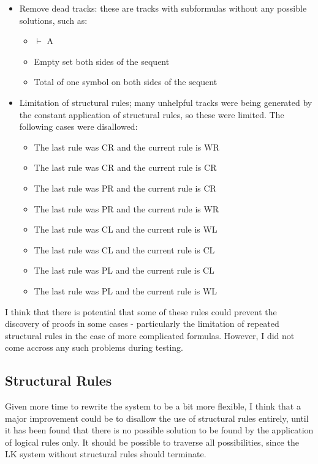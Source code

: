 \documentclass{article}
\begin{document}
\begin{itemize}
  \item Remove dead tracks: these are tracks with subformulas without any
  possible solutions, such as:
  \begin{itemize}
    \item $\vdash$ A
    \item Empty set both sides of the sequent
    \item Total of one symbol on both sides of the sequent
  \end{itemize}

  \item Limitation of structural rules; many unhelpful tracks were being generated by
  the constant application of structural rules, so these were limited. The
  following cases were disallowed:
  \begin{itemize}
    \item The last rule was CR and the current rule is WR
    \item The last rule was CR and the current rule is CR
    \item The last rule was PR and the current rule is CR
    \item The last rule was PR and the current rule is WR
    \item The last rule was CL and the current rule is WL
    \item The last rule was CL and the current rule is CL
    \item The last rule was PL and the current rule is CL
    \item The last rule was PL and the current rule is WL
  \end{itemize}
\end{itemize}

I think that there is potential that some of these rules could prevent the
discovery of proofs in some cases - particularly the limitation of repeated
structural rules in the case of more complicated formulas. However, I did not
come accross any such problems during testing.

\subsection{Structural Rules}

Given more time to rewrite the system to be a bit more flexible, I think that a
major improvement could be to disallow the use of structural rules entirely,
until it has been found that there is no possible solution to be found by the
application of logical rules only. It should be possible to traverse all
possibilities, since the LK system without structural rules should terminate.
\end{document}
